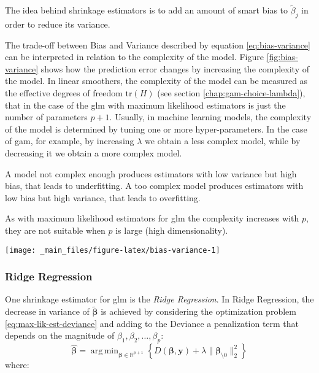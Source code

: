 \documentclass[a4paper, twoside, openright, 12pt]{report}
\let\origfigure\figure
\let\endorigfigure\endfigure
\renewenvironment{figure}[1][2] {
  \expandafter\origfigure\expandafter[!hbtp]
} {
  \endorigfigure
}
\DeclareMathOperator*{\argmin}{arg\,min}  %
\theoremstyle{definition}
\theoremstyle{definition}
\theoremstyle{definition}
\theoremstyle{remark}
\begin{document}
The idea behind shrinkage estimators is to add an amount of smart bias to \(\tilde{\beta}_j\) in order to reduce its variance.

The trade-off between Bias and Variance described by equation \eqref{eq:bias-variance} can be interpreted in relation to the complexity of the model. Figure \ref{fig:bias-variance} shows how the prediction error changes by increasing the complexity of the model. In linear smoothers, the complexity of the model can be measured as the effective degrees of freedom \(\text{tr}(H)\) (see section \ref{chap:gam-choice-lambda}), that in the case of the \ac{glm} with maximum likelihood estimators is just the number of parameters \(p+1\). Usually, in machine learning models, the complexity of the model is determined by tuning one or more hyper-parameters. In the case of \ac{gam}, for example, by increasing \(\lambda\) we obtain a less complex model, while by decreasing it we obtain a more complex model.

A model not complex enough produces estimators with low variance but high bias, that leads to underfitting. A too complex model produces estimators with low bias but high variance, that leads to overfitting.

As with maximum likelihood estimators for \ac{glm} the complexity increases with \(p\), they are not suitable when \(p\) is large (high dimensionality).





\begin{figure}[!hbtp]

{\centering \texttt{[image: \_main\_files/figure-latex/bias-variance-1]} 

}

\caption[The Bias-Variance trade off.]{The Bias-Variance trade off. The horizontal axis shows the increase in complexity and the vertical axis shows the effect on in-sample error (training set) and out-of-sample error (test set). The error can be measured as the Mean Squared Error (MSE) or in general as the Deviance.}\label{fig:bias-variance}
\end{figure}

\hypertarget{ridge-regression}{%
\subsubsection{Ridge Regression}\label{ridge-regression}}

One shrinkage estimator for \ac{glm} is the \emph{Ridge Regression}. In Ridge Regression, the decrease in variance of \(\tilde{\boldsymbol{\beta}}\) is achieved by considering the optimization problem \eqref{eq:max-lik-est-deviance} and adding to the Deviance a penalization term that depends on the magnitude of \(\beta_1, \beta_2, \dots, \beta_p\):
\begin{equation}
\label{eq:ridge-est-deviance}
\hat{\boldsymbol{\beta}} = \argmin_{\boldsymbol{\beta}\in\mathbb{R}^{p+1}}{\left\{D(\boldsymbol{\beta}, \boldsymbol{y}) + \lambda \|\boldsymbol{\beta}_{\setminus0}\|_2^2\right\}}
\end{equation}
where:
\end{document}
